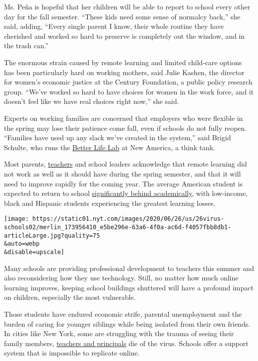 Ms. Peña is hopeful that her children will be able to report to school
every other day for the fall semester. ``These kids need some sense of
normalcy back,'' she said, adding, ``Every single parent I know, their
whole routine they have cherished and worked so hard to preserve is
completely out the window, and in the trash can.''

The enormous strain caused by remote learning and limited child-care
options has been particularly hard on working mothers, said Julie
Kashen, the director for women's economic justice at the Century
Foundation, a public policy research group. ``We've worked so hard to
have choices for women in the work force, and it doesn't feel like we
have real choices right now,'' she said.

Experts on working families are concerned that employers who were
flexible in the spring may lose their patience come fall, even if
schools do not fully reopen. ``Families have used up any slack we've
created in the system,'' said Brigid Schulte, who runs the
\href{https://www.newamerica.org/better-life-lab/}{Better Life Lab} at
New America, a think tank.

Most parents,
\href{https://www.nytimes.com/2020/07/11/us/virus-teachers-classrooms.html}{teachers}
and school leaders acknowledge that remote learning did not work as well
as it should have during the spring semester, and that it will need to
improve rapidly for the coming year. The average American student is
expected to return to school
\href{https://www.nytimes.com/2020/06/05/us/coronavirus-education-lost-learning.html}{significantly
behind academically}, with low-income, black and Hispanic students
experiencing the greatest learning losses.

\texttt{[image: https://static01.nyt.com/images/2020/06/26/us/26virus-schools02/merlin\_173956410\_e5be296e-63a6-4f0a-ac6d-f4057fbb8db1-articleLarge.jpg?quality=75\\\&auto=webp\\\&disable=upscale]}

Many schools are providing professional development to teachers this
summer and also reconsidering how they use technology. Still, no matter
how much online learning improves, keeping school buildings shuttered
will have a profound impact on children, especially the most vulnerable.

Those students have endured economic strife, parental unemployment and
the burden of caring for younger siblings while being isolated from
their own friends. In cities like New York, some are struggling with the
trauma of seeing their family members,
\href{https://www.nytimes.com/2020/04/07/obituaries/sandra-santos-vizcaino-dead-coronavirus.html}{teachers
and principals} die of the virus. Schools offer a support system that is
impossible to replicate online.

